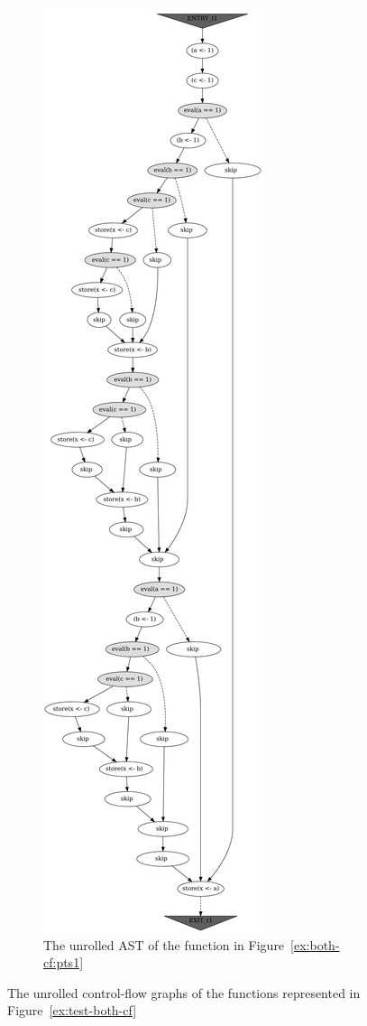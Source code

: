 \begin{figure}
\begin{subfigure}[b]{.3\textwidth}
  \includegraphics[height=.9\textheight,width=\textwidth]{img/my/graphs/unrolling-comparison/Porthos/t0_unrolled.png}
    \caption{The unrolled AST of the function in Figure~\ref{ex:both-cf:pts1}}
    \hfill
  \label{ex:both-cf:graphU:pts1}
\end{subfigure}
\hfill
%
\caption{The unrolled control-flow graphs of the functions represented in Figure~\ref{ex:test-both-cf}}
\label{ex:test-both-pic-unroll}
\end{figure}

